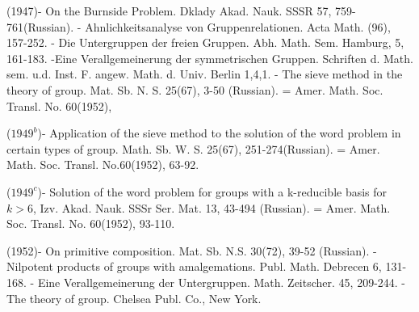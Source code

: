 \begin{thebibliography}{99}
  (1947)- On the Burnside Problem. Dklady
  Akad. Nauk. SSSR 57, 759-761(Russian). 
- Ahnlichkeitsanalyse von
  Gruppenrelationen. Acta Math. (96), 157-252. 
- Die Untergruppen der freien
  Gruppen. Abh. Math. Sem. Hamburg, 5, 161-183. 
-Eine Verallgemeinerung der
  symmetrischen Gruppen. Schriften
  d. Math. sem. u.d. Inst. F. angew. Math. d. Univ. Berlin 1,4,1. 
- The sieve method in the
  theory of group. Mat. Sb. N. S. 25(67), 3-50 (Russian). =
  Amer. Math. Soc. Transl. No. 60(1952), 

  ($1949^b$)\pageoriginale -
  Application of the sieve 
  method to the solution of the word problem in certain types of
  group. Math. Sb. W. S. 25(67), 251-274(Russian). =
  Amer. Math. Soc. Transl. No.60(1952), 63-92. 

  ($1949^c$)- Solution of the word problem for groups
  with a k-reducible basis for $k > 6$, Izv. Akad. Nauk. SSSr
  Ser. Mat. 13, 43-494 (Russian). =
  Amer. Math. Soc. Transl. No. 60(1952), 93-110. 

  (1952)- On primitive composition. Mat. Sb. N.S. 30(72),
  39-52 (Russian). 
-Nilpotent products of groups with
  amalgemations. Publ. Math. Debrecen 6, 131-168. 
- Eine Verallgemeinerung der
  Untergruppen. Math. Zeitscher. 45, 209-244. 
- The theory of group. Chelsea
  Publ. Co., New York.
\end{thebibliography}

